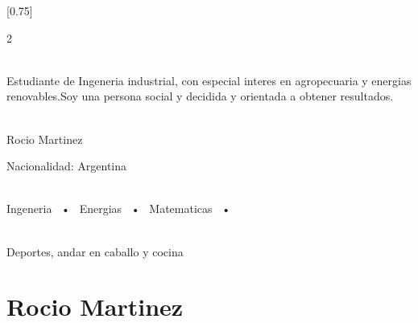 \documentclass[lighthipster]{simplehipstercv}
\begin{document}
\setlength{\columnsep}{1.5cm}
[0.75]
\begin{paracol}{2}

\paracolbackgroundoptions



\footnotesize
{\setasidefontcolour
\flushright
\begin{center}
\end{center}

\\[0.5em]

{\footnotesize
Estudiante de Ingeneria industrial, con especial interes en agropecuaria y energias renovables.Soy una persona social y decidida y orientada a obtener resultados. }
\bigskip

 \\[0.5em]
Rocio Martinez

Nacionalidad: Argentina



\bigskip

 \\[0.5em]

Ingeneria ~•~ Energias ~•~ Matematicas ~•~ 

\bigskip



\bigskip

\\[0.5em]
Deportes, andar en caballo y cocina
\bigskip


\vspace{4em}


\phantom{turn the page}

\phantom{turn the page}
}
\switchcolumn

\small
\section*{Rocio Martinez}


\end{paracol}
\end{document}
